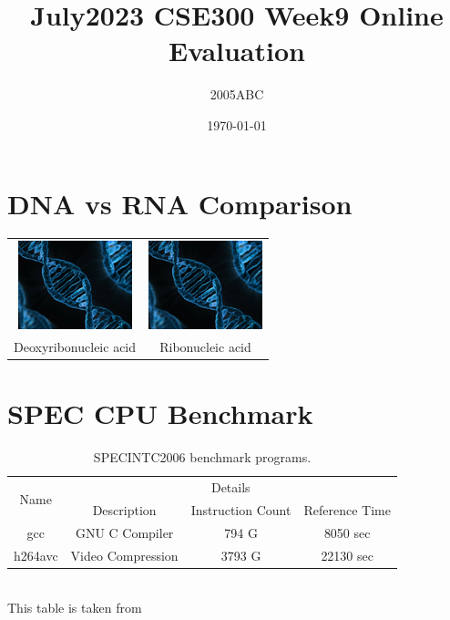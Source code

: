 \documentclass[11pt]{article}
\title{July2023 CSE300 Week9 Online Evaluation}
\author{2005ABC}
\date{\today}
\begin{document}
    \maketitle
    \section*{DNA vs RNA Comparison}
    \begin{table}[h]
        \centering
        \begin{tabular}{c|c}
             \includegraphics[]{images/DNA.png}&
            \includegraphics[]{images/DNA.png}\\
               Deoxyribonucleic acid& 
                Ribonucleic acid\\
         \end{tabular}
        \label{tab:my_label}
    \end{table}
    \section*{SPEC CPU Benchmark}
    \begin{table}[h]
        \centering
        \caption{SPECINTC2006 benchmark programs.}
        \begin{tabular}{|c|c|c|c|}
            \hline
             \multirow{2}{*}{Name}&\multicolumn{3}{c|}{Details}\\
             \cline{2-4}
             &Description&Instruction Count&Reference Time\\
             \hline
             gcc&GNU C Compiler&794 G&8050 sec\\
             \hline
             h264avc&Video Compression&3793 G&22130 sec\\
             \hline
        \end{tabular}
        \label{tab:my_label}
        \\This table is taken from \cite{vidref}
    \end{table}
    
\end{document}
